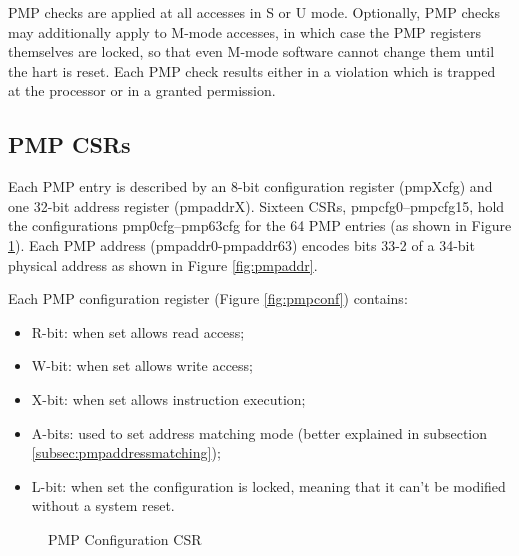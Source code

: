 PMP checks are applied at all accesses in S or U mode. Optionally, PMP checks
may additionally apply to M-mode accesses, in which case the PMP registers themselves
are locked, so that even M-mode software cannot change them until the hart is
reset. Each PMP check results either in a violation which is trapped at the processor
or in a granted permission.

\subsection{PMP CSRs}

Each PMP entry is described by an 8-bit configuration register (pmpXcfg) and one
32-bit address register (pmpaddrX). Sixteen CSRs, pmpcfg0–pmpcfg15, hold the configurations
pmp0cfg–pmp63cfg for the 64 PMP entries (as shown in Figure \ref{fig:pmpcfgs}).
Each PMP address (pmpaddr0-pmpaddr63) encodes bits 33-2 of a 34-bit physical
address as shown in Figure \ref{fig:pmpaddr}.

Each PMP configuration register (Figure \ref{fig:pmpconf}) contains:
\begin{itemize}
  \item R-bit: when set allows read access;

  \item W-bit: when set allows write access;

  \item X-bit: when set allows instruction execution;

  \item A-bits: used to set address matching mode (better explained in subsection
    \ref{subsec:pmpaddressmatching});

  \item L-bit: when set the configuration is locked, meaning that it can't be modified
    without a system reset.
\end{itemize}

\begin{figure}[htbp]
  \centering
  \def\stackalignment{r} %
  {\scriptsize }
  \caption{PMP Configuration CSR}
  \label{fig:pmpcfgs}
\end{figure}

